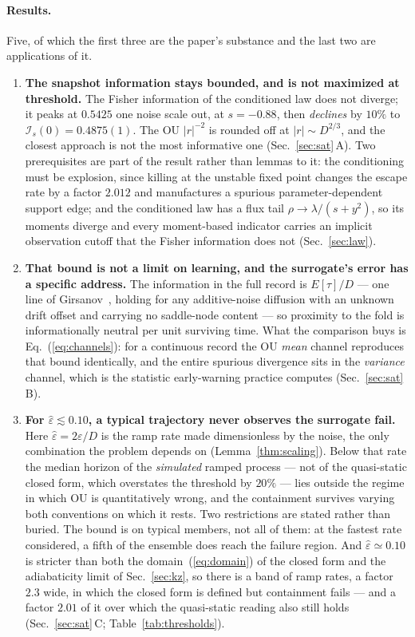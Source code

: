 \documentclass[%
 twocolumn,
 superscriptaddress,
 amsmath,amssymb,
 aps,
 pre,
 floatfix,
]{revtex4-2}
\newcommand{\Ifish}{\mathcal{I}}
\newcommand{\Sig}{\hat\varepsilon}
\begin{document}
\paragraph{Results.}
Five, of which the first three are the paper's substance and the last two are applications of it.
\begin{enumerate}

\item \textbf{The snapshot information stays bounded, and is not maximized at threshold.}  The Fisher information of the conditioned law does not diverge; it peaks at $0.5425$ one noise scale out, at $s=-0.88$, then \emph{declines} by $10\%$ to $\Ifish_s(0)=0.4875(1)$.  The OU $|r|^{-2}$ is rounded off at $|r|\sim D^{2/3}$, and the closest approach is not the most informative one (Sec.~\ref{sec:sat}\,A).  Two prerequisites are part of the result rather than lemmas to it: the conditioning must be explosion, since killing at the unstable fixed point changes the escape rate by a factor $2.012$ and manufactures a spurious parameter-dependent support edge; and the conditioned law has a flux tail $\rho\to\lambda/(s+y^2)$, so its moments diverge and every moment-based indicator carries an implicit observation cutoff that the Fisher information does not (Sec.~\ref{sec:law}).

\item \textbf{That bound is not a limit on learning, and the surrogate's error has a specific address.}  The information in the full record is $E[\tau]/D$ --- one line of Girsanov~\cite{LiptserShiryaev2001b}, holding for any additive-noise diffusion with an unknown drift offset and carrying no saddle-node content --- so proximity to the fold is informationally neutral per unit surviving time.  What the comparison buys is Eq.~(\ref{eq:channels}): for a continuous record the OU \emph{mean} channel reproduces that bound identically, and the entire spurious divergence sits in the \emph{variance} channel, which is the statistic early-warning practice computes (Sec.~\ref{sec:sat}\,B).

\item \textbf{For $\Sig\lesssim0.10$, a typical trajectory never observes the surrogate fail.}  Here $\Sig=2\varepsilon/D$ is the ramp rate made dimensionless by the noise, the only combination the problem depends on (Lemma~\ref{thm:scaling}).  Below that rate the median horizon of the \emph{simulated} ramped process --- not of the quasi-static closed form, which overstates the threshold by $20\%$ --- lies outside the regime in which OU is quantitatively wrong, and the containment survives varying both conventions on which it rests.  Two restrictions are stated rather than buried.  The bound is on typical members, not all of them: at the fastest rate considered, a fifth of the ensemble does reach the failure region.  And $\Sig\simeq0.10$ is stricter than both the domain~(\ref{eq:domain}) of the closed form and the adiabaticity limit of Sec.~\ref{sec:kz}, so there is a band of ramp rates, a factor $2.3$ wide, in which the closed form is defined but containment fails --- and a factor $2.01$ of it over which the quasi-static reading also still holds (Sec.~\ref{sec:sat}\,C; Table~\ref{tab:thresholds}).


\end{enumerate}
\end{document}
